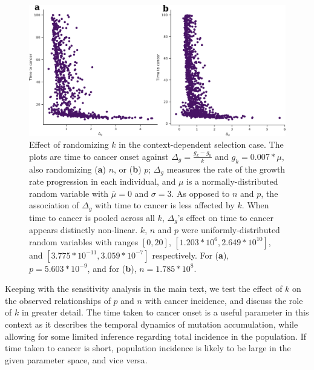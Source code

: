 \documentclass[12pt,onecolumn,twoside]{article}
\begin{document}
		\begin{figure}[tbhp]
			\centering
			\includegraphics[width=\linewidth, keepaspectratio=true]{figS2-2.png}
			\caption{Effect of randomizing $k$ in the context-dependent selection case. The plots are time to cancer onset against $\Delta_{g} = \frac{g_{k}-g_{0}}{k}$ and $g_{k} = 0.007*\mu$, also randomizing (\textbf{a}) $n$, or (\textbf{b}) $p$; $\Delta_{g}$ measures the rate of the growth rate progression in each individual, and $\mu$ is a normally-distributed random variable with $\overline{\mu}=0$ and $\sigma=3$. As opposed to $n$ and $p$, the association of $\Delta_{g}$ with time to cancer is less affected by $k$. When time to cancer is pooled across all $k$, $\Delta_{g}$'s effect on time to cancer appears distinctly non-linear. $k$, $n$ and $p$ were uniformly-distributed random variables with ranges $[0, 20]$, $[1.203*10^{6}, 2.649*10^{10}]$, and $[3.775*10^{-11}, 3.059*10^{-7}]$ respectively. For (\textbf{a}), $p=5.603*10^{-9}$, and for (\textbf{b}), $n=1.785*10^{8}$.}
			\label{figS2.2}
		\end{figure}

		Keeping with the sensitivity analysis in the main text, we test the effect of $k$ on the observed relationships of $p$ and $n$ with cancer incidence, and discuss the role of $k$ in greater detail. The time taken to cancer onset is a useful parameter in this context as it describes the temporal dynamics of mutation accumulation, while allowing for some limited inference regarding total incidence in the population. If time taken to cancer is short, population incidence is likely to be large in the given parameter space, and vice versa.
\end{document}

